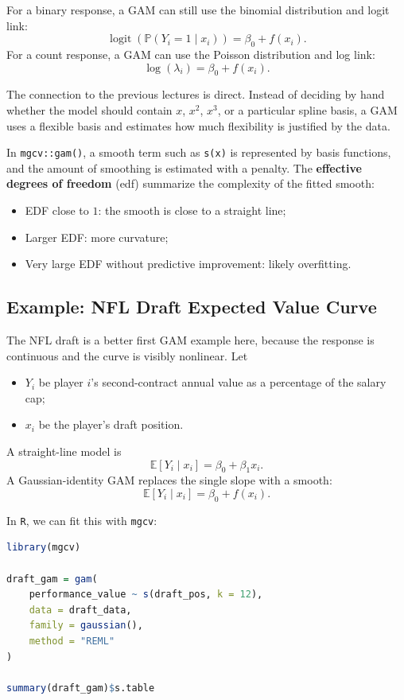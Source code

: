 \documentclass[twoside]{article}
\theoremstyle{definition}
\renewcommand{\P}{\mathbb{P}}
\newcommand{\E}{\mathbb{E}}
\newcommand{\logit}{\operatorname{logit}}
\begin{document}
For a binary response, a GAM can still use the binomial distribution and logit link:
\[
    \logit\!\left(\P(Y_i = 1 \mid x_i)\right) = \beta_0 + f(x_i).
\]
For a count response, a GAM can use the Poisson distribution and log link:
\[
    \log(\lambda_i) = \beta_0 + f(x_i).
\]

The connection to the previous lectures is direct. Instead of deciding by hand whether the model should contain $x$, $x^2$, $x^3$, or a particular spline basis, a GAM uses a flexible basis and estimates how much flexibility is justified by the data.

In \texttt{mgcv::gam()}, a smooth term such as \texttt{s(x)} is represented by basis functions, and the amount of smoothing is estimated with a penalty. The \textbf{effective degrees of freedom} (edf) summarize the complexity of the fitted smooth:
\begin{itemize}
    \item[-] EDF close to $1$: the smooth is close to a straight line;
    \item[-] Larger EDF: more curvature;
    \item[-] Very large EDF without predictive improvement: likely overfitting.
\end{itemize}

\subsection{Example: NFL Draft Expected Value Curve}

The NFL draft is a better first GAM example here, because the response is continuous and the curve is visibly nonlinear. Let
\begin{itemize}
    \item[-] $Y_i$ be player $i$'s second-contract annual value as a percentage of the salary cap;
    \item[-] $x_i$ be the player's draft position.
\end{itemize}

A straight-line model is
\[
    \E[Y_i \mid x_i] = \beta_0 + \beta_1x_i.
\]
A Gaussian-identity GAM replaces the single slope with a smooth:
\[
    \E[Y_i \mid x_i] = \beta_0 + f(x_i).
\]

In \texttt{R}, we can fit this with \texttt{mgcv}:
\begin{lstlisting}[language=R]
library(mgcv)

draft_gam = gam(
    performance_value ~ s(draft_pos, k = 12),
    data = draft_data,
    family = gaussian(),
    method = "REML"
)

summary(draft_gam)$s.table
\end{lstlisting}
\end{document}
